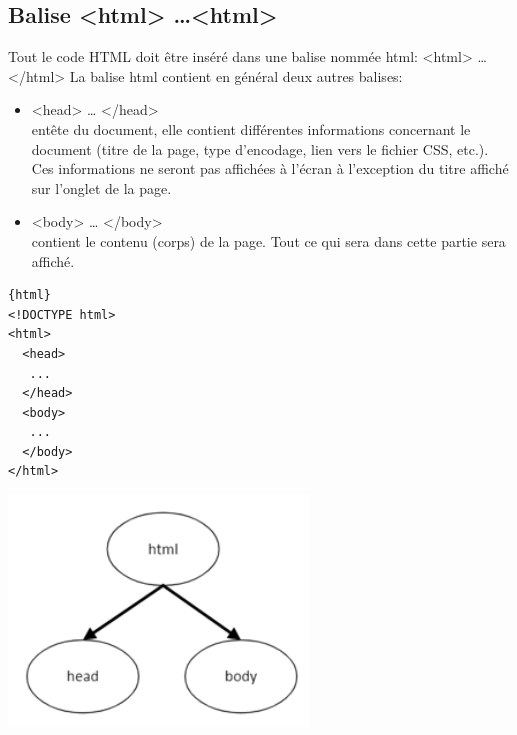 \documentclass[a4paper,11pt]{article}
\begin{document}
\subsection{Balise <html> \dots <html>}
Tout le code HTML doit être inséré dans une balise nommée html: <html> … </html>
La balise html contient en général deux autres balises:
\begin{itemize}
\item <head> … </head>\\
entête du document, elle contient différentes informations concernant le document (titre de la page, type d'encodage, lien vers le fichier CSS, etc.).
Ces informations ne seront pas affichées à l'écran à l'exception du titre affiché sur l'onglet de la page.
\item <body> … </body>\\
contient le contenu (corps) de la page. Tout ce qui sera dans cette partie sera affiché.
\end{itemize}
\begin{multicols}{2}
\begin{verbatim}{html}
<!DOCTYPE html>
<html>
  <head>
   ...
  </head>
  <body>
   ...
  </body>
</html>
\end{verbatim}
\includegraphics[width=0.6\textwidth]{images/baliseHTML.png} \\
\end{multicols}

\newpage
\end{document}
